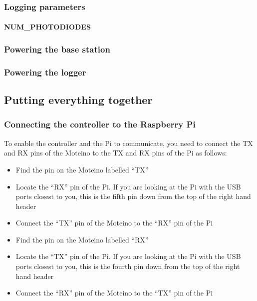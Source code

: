 \documentclass[10pt]{article}
\begin{document}
\subsubsection{Logging parameters}

\paragraph{NUM\_PHOTODIODES}

\subsubsection{Powering the base station}

\subsubsection{Powering the logger}

\subsection{Putting everything together}

\subsubsection{Connecting the controller to the Raspberry Pi}

To enable the controller and the Pi to communicate, you need to connect the TX and RX pins of the Moteino to the TX and RX pins of the Pi as follows:

\begin{itemize}
 \item Find the pin on the Moteino labelled ``TX''
 \item Locate the ``RX'' pin of the Pi. If you are looking at the Pi with the USB ports closest to you, this is the fifth pin down from the top of the right hand header
 \item Connect the ``TX'' pin of the Moteino to the ``RX'' pin of the Pi
 \item Find the pin on the Moteino labelled ``RX''
 \item Locate the ``TX'' pin of the Pi. If you are looking at the Pi with the USB ports closest to you, this is the fourth pin down from the top of the right hand header
 \item Connect the ``RX'' pin of the Moteino to the ``TX'' pin of the Pi
\end{itemize}
\end{document}
